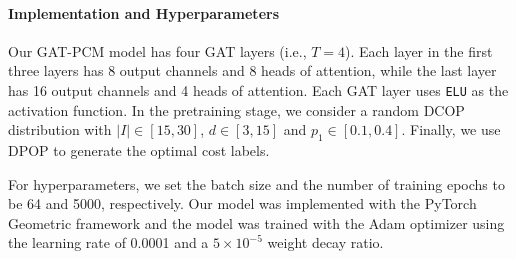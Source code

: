 \documentclass[letterpaper]{article} %
\begin{document}
\paragraph{Implementation and Hyperparameters} Our GAT-PCM model has four GAT layers (i.e., $T=4$). Each layer in the first three layers has 8 output channels and 8 heads of attention, while the last layer has 16 output channels and 4 heads of attention. Each GAT layer uses \texttt{ELU} \cite{clevertUH15} as the activation function. In the pretraining stage, we consider a random DCOP distribution with $|I|\in[15,30]$, $d\in[3,15]$ and $p_1\in[0.1,0.4]$. Finally, we use DPOP \cite{petcuscalable} to generate the optimal cost labels. %

For hyperparameters, we set the batch size and the number of training epochs to be 64 and 5000, respectively. Our model was implemented with the PyTorch Geometric framework \cite{lenssen2019} and the model was trained with the Adam optimizer \cite{kingma2014adam} using the learning rate of 0.0001 and a $5\times 10^{-5}$ weight decay ratio.
\end{document}
